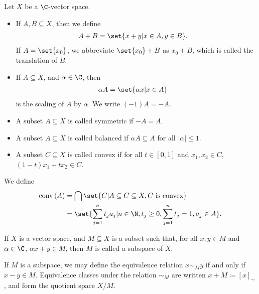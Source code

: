 \begin{definition}\label{def:vector_space_subset_operations}
  Let $X$ be a $\C$-vector space.
  \begin{itemize}
    \item If $A,B\subseteq X$, then we define
      \begin{align*}
        A + B &= \set{x + y | x\in A,y\in B}.
      \end{align*}
      If $A = \set{x_0}$, we abbreviate $\set{x_0} + B$ as $x_0 + B$, which is called the translation of $B$.
    \item If $A\subseteq X$, and $\alpha\in \C$, then
      \begin{align*}
        \alpha A &= \set{\alpha x | x\in A}
      \end{align*}
      is the scaling of $A$ by $\alpha$. We write $(-1)A = -A$.
    \item A subset $A\subseteq X$ is called symmetric if $-A = A$.
    \item A subset $A\subseteq X$ is called balanced if $\alpha A\subseteq A$ for all $\left\vert \alpha \right\vert\leq 1$.
    \item A subset $C\subseteq X$ is called convex if for all $t\in [0,1]$ and $x_1,x_2\in C$, $\left(1-t\right)x_1 + tx_2 \in C$.
  \end{itemize}
  We define
  \begin{align*}
    \operatorname{conv}\left(A\right) &= \bigcap\set{C | A\subseteq C\subseteq X,C\text{ is convex}}\\
                                      &= \set{\sum_{j=1}^{n}t_ja_j | n\in\N,t_j\geq 0,\sum_{j=1}^{n}t_j = 1,a_j\in A}.
  \end{align*}
\end{definition}
\begin{definition}
  If $X$ is a vector space, and $M\subseteq X$ is a subset such that, for all $x,y\in M$ and $\alpha\in \C$, $\alpha x + y\in M$, then $M$ is called a subspace of $X$.\newline

  If $M$ is a subspace, we may define the equivalence relation $x\sim_{M} y$ if and only if $x-y\in M$. Equivalence classes under the relation $\sim_{M}$ are written $x + M\coloneq \left[x\right]_{\sim}$, and form the quotient space $X/M$.
\end{definition}
